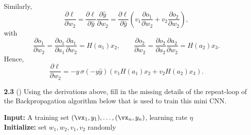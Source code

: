 Similarly,
\[
\frac{\partial \ell}{\partial w_2}
=
\frac{\partial \ell}{\partial \hat y}\frac{\partial \hat y}{\partial w_2}
=
\frac{\partial \ell}{\partial \hat y}
\left(
v_1\frac{\partial o_1}{\partial w_2}
+
v_2\frac{\partial o_2}{\partial w_2}
\right),
\]
with
\[
\frac{\partial o_1}{\partial w_2}
=
\frac{\partial o_1}{\partial a_1}\frac{\partial a_1}{\partial w_2}
=
H(a_1)x_2,
\qquad
\frac{\partial o_2}{\partial w_2}
=
\frac{\partial o_2}{\partial a_2}\frac{\partial a_2}{\partial w_2}
=
H(a_2)x_3.
\]
Hence,
\[
\frac{\partial \ell}{\partial w_2}
=
-y\,\sigma(-y\hat y)\left(v_1H(a_1)x_2+v_2H(a_2)x_3\right).
\]

\bigskip

\textbf{2.3} () Using the derivations above, fill in the missing details of the repeat-loop of the Backpropagation algorithm below that is used to train this mini CNN.\\

\begin{algorithm}[h]
\DontPrintSemicolon
\caption{Backpropagation for the above mini CNN }\label{alg:backprop}
{\bf Input:} A training set $(\vx_1, y_1),  \ldots , (\vx_n , y_n )$, learning rate $\eta$ \\
{\bf Initialize:}  set $w_1, w_2, v_1, v_2$ randomly  \\
\end{algorithm}
